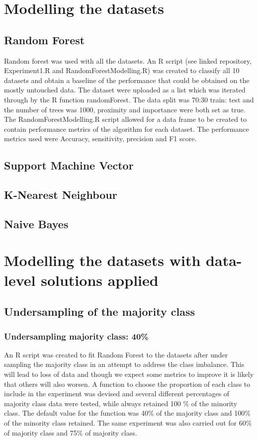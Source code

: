 \section{Modelling the datasets}
\subsection{Random Forest}
Random forest was used with all the datasets. An R script (see linked repository, Experiment1.R and RandomForestModelling.R) was created to classify all 10 datasets and obtain a baseline of the performance that could be obtained on the mostly untouched data.
The dataset were uploaded as a list which was iterated through by the R function randomForest. The data split was 70:30 train: test and the number of trees was 1000, proximity and importance were both set as true.\newline
The RandomForestModelling.R script allowed for a data frame to be created to contain performance metrics of the algorithm for each dataset.\newline
The performance metrics used were Accuracy, sensitivity, precision and F1 score.\newline

\subsection{Support Machine Vector}
\subsection{K-Nearest Neighbour}
\subsection{Naive  Bayes}
\section{Modelling the datasets with data-level solutions applied}
\subsection{Undersampling of the majority class}
\subsubsection{Undersampling majority class: 40\%}
An R script was created to fit Random Forest to the datasets after under sampling the majority class in an attempt to address the class imbalance. This will lead to loss of data and though we expect some metrics to improve it is likely that others will also worsen.\newline
A function to choose the proportion of each class to include in the experiment was devised and several different percentages of majority class data were tested, while always retained 100 \% of the minority class.  The default value for the function was 40\% of the majority class and 100\% of the minority class retained. The same experiment was also carried out for 60\% of majority class and 75\% of majority class.\newline
